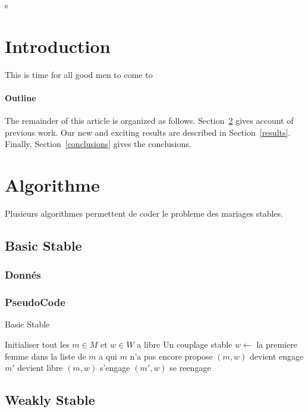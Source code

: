 \documentclass[11pt]{article}
\begin{document}
\maketitle
s


\section{Introduction}
This is time for all good men to come to 
\paragraph{Outline}
The remainder of this article is organized as follows.
Section~\ref{algo} gives account of previous work.
Our new and exciting results are described in Section~\ref{results}.
Finally, Section~\ref{conclusions} gives the conclusions.

\section{Algorithme}\label{algo}
Plusieurs algorithmes permettent de coder le probleme des mariages stables.

\subsection{Basic Stable}

\subsubsection{Donn\'es}
\subsubsection{PseudoCode}
\begin{algorithm}
\caption{Basic Stable}
\begin{algorithmic} 
\REQUIRE Initialiser tout les $m \in M$ et $w \in W$ a libre
\ENSURE Un couplage stable
\STATE $w \leftarrow$ la premiere femme dans la liste de $m$ a qui $m$ n'a pas
encore propose
\STATE $(m, w)$ devient engage
\STATE $m'$ devient libre
\STATE $(m, w)$ s'engage
\ELSE
\STATE $(m', w)$ se reengage
\ENDIF
\ENDIF
\ENDWHILE
\end{algorithmic}
\end{algorithm}
    
\subsection{Weakly Stable}
\end{document}
